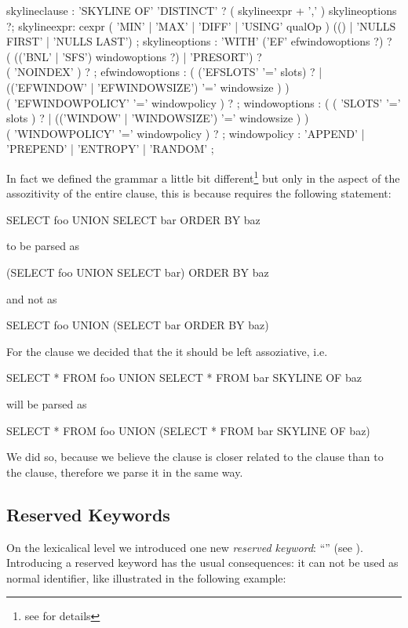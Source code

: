 \begin{rail}
skylineclause : 'SKYLINE OF' 'DISTINCT' ? ( skylineexpr + ',' ) skylineoptions ?;
skylineexpr: cexpr ( 'MIN' | 'MAX' | 'DIFF' | 'USING' qualOp ) (() | 'NULLS FIRST' | 'NULLS LAST') ;
skylineoptions : 'WITH' ('EF' efwindowoptions ?) ? \\ ( (('BNL' | 'SFS') windowoptions ?) | 'PRESORT') ? \\ ( 'NOINDEX' ) ? ;
efwindowoptions : ( ('EFSLOTS' '=' slots) ? | (('EFWINDOW' | 'EFWINDOWSIZE') '=' windowsize ) ) \\ ( 'EFWINDOWPOLICY' '=' windowpolicy ) ? ;
windowoptions : ( ( 'SLOTS' '=' slots ) ? | (('WINDOW' | 'WINDOWSIZE') '=' windowsize ) ) \\ ( 'WINDOWPOLICY' '=' windowpolicy ) ? ;
windowpolicy : 'APPEND' | 'PREPEND' | 'ENTROPY' | 'RANDOM' ;

\end{rail}


In fact we defined the grammar a little bit different\footnote{see  for details} but only in the aspect of the assozitivity of the entire  clause, this is because  requires the following statement:
\begin{sql}SELECT foo UNION SELECT bar ORDER BY baz\end{sql}
to be parsed as 
\begin{sql}(SELECT foo UNION SELECT bar) ORDER BY baz\end{sql}
and not as
\begin{sql}SELECT foo UNION (SELECT bar ORDER BY baz)\end{sql}

\noindent{}For the  clause we decided that the it should be left
assoziative, i.e. 
\begin{sql}SELECT * FROM foo UNION SELECT * FROM bar SKYLINE OF baz\end{sql}
will be parsed as 
\begin{sql}SELECT * FROM foo UNION (SELECT * FROM bar SKYLINE OF baz)\end{sql}

\noindent{}We did so, because we believe the  clause is closer
related to the  clause than to the 
clause, therefore we parse it in the same way.

\subsection{Reserved Keywords}
On the lexicalical level we introduced one new \emph{reserved
keyword}: ``'' (see
). Introducing a reserved
keyword has the usual consequences: it can not be used as normal
identifier, like illustrated in the following example:

